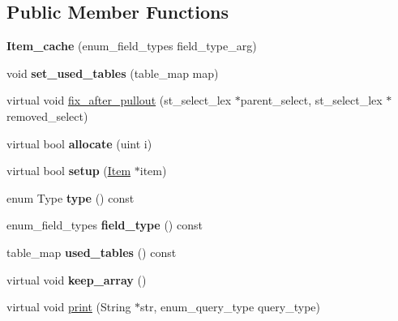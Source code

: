 \subsection*{Public Member Functions}
\begin{DoxyCompactItemize}
\item 
\mbox{\label{classItem__cache_a50c7bf6e2c62ee66557cbfb09d9f613f}} 
{\bfseries Item\+\_\+cache} (enum\+\_\+field\+\_\+types field\+\_\+type\+\_\+arg)
\item 
\mbox{\label{classItem__cache_ac23096c28f9b40fbadc3615ca651c0d6}} 
void {\bfseries set\+\_\+used\+\_\+tables} (table\+\_\+map map)
\item 
virtual void \mbox{\hyperlink{classItem__cache_a2d1447a09b8702eb448c8176043fe748}{fix\+\_\+after\+\_\+pullout}} (st\+\_\+select\+\_\+lex $\ast$parent\+\_\+select, st\+\_\+select\+\_\+lex $\ast$removed\+\_\+select)
\item 
\mbox{\label{classItem__cache_ae70dcfa86eddbed0b9f7872b6c09134d}} 
virtual bool {\bfseries allocate} (uint i)
\item 
\mbox{\label{classItem__cache_a8f5e91524936d4d9101465744e9c69fa}} 
virtual bool {\bfseries setup} (\mbox{\hyperlink{classItem}{Item}} $\ast$item)
\item 
\mbox{\label{classItem__cache_a127cb284da63259ad598e559685a3215}} 
enum Type {\bfseries type} () const
\item 
\mbox{\label{classItem__cache_ab320c3a01e52e23faa8b4a7d5c6d5d5b}} 
enum\+\_\+field\+\_\+types {\bfseries field\+\_\+type} () const
\item 
\mbox{\label{classItem__cache_adc459362804f59499bb19be1a8568938}} 
table\+\_\+map {\bfseries used\+\_\+tables} () const
\item 
\mbox{\label{classItem__cache_ac07a9a8958a38e39d0544ec5ea3bcf57}} 
virtual void {\bfseries keep\+\_\+array} ()
\item 
virtual void \mbox{\hyperlink{classItem__cache_aecabd691684004d947417423448a4ff3}{print}} (String $\ast$str, enum\+\_\+query\+\_\+type query\+\_\+type)

\end{DoxyCompactItemize}
